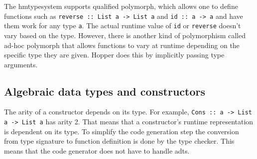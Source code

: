 The \gls{hmtypesystem} supports qualified \gls{polymorph}, which allows one to define functions such as \texttt{reverse :: List a -> List a} and \texttt{id :: a -> a} and have them work for any type \texttt{a}. The actual runtime value of \texttt{id} or \texttt{reverse} doesn't vary based on the type. However, there is another kind of polymorphism called ad-hoc \gls{polymorph} that allows functions to vary at runtime depending on the specific type they are given. Hopper does this by implicitly passing type arguments.





\subsection{Algebraic data types and constructors}

The arity of a constructor depends on its type. For example, \texttt{Cons :: a -> List a -> List a} has arity 2. That means that a constructor's runtime representation is dependent on its type.
To simplify the code generation step the conversion from type signature to function definition is done by the type checker. This means that the code generator does not have to handle \glspl{adt}. 

